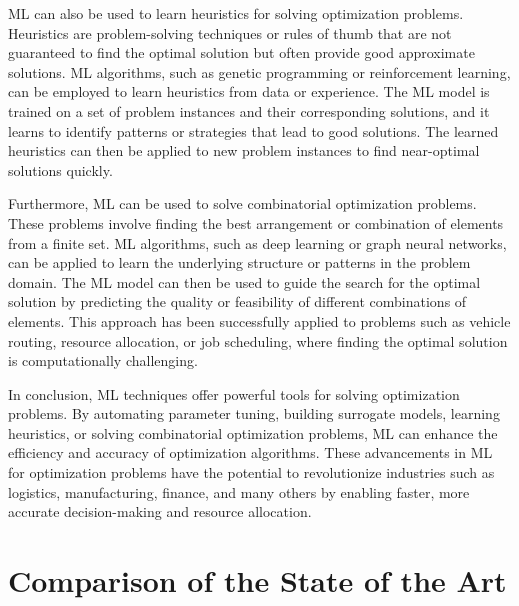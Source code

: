ML can also be used to learn heuristics for solving optimization problems. Heuristics are problem-solving techniques or rules of thumb that are not guaranteed to find the optimal solution but often provide good approximate solutions. ML algorithms, such as genetic programming or reinforcement learning, can be employed to learn heuristics from data or experience. The ML model is trained on a set of problem instances and their corresponding solutions, and it learns to identify patterns or strategies that lead to good solutions. The learned heuristics can then be applied to new problem instances to find near-optimal solutions quickly.

Furthermore, ML can be used to solve combinatorial optimization problems. These problems involve finding the best arrangement or combination of elements from a finite set. ML algorithms, such as deep learning or graph neural networks, can be applied to learn the underlying structure or patterns in the problem domain. The ML model can then be used to guide the search for the optimal solution by predicting the quality or feasibility of different combinations of elements. This approach has been successfully applied to problems such as vehicle routing, resource allocation, or job scheduling, where finding the optimal solution is computationally challenging.

In conclusion, ML techniques offer powerful tools for solving optimization problems. By automating parameter tuning, building surrogate models, learning heuristics, or solving combinatorial optimization problems, ML can enhance the efficiency and accuracy of optimization algorithms. These advancements in ML for optimization problems have the potential to revolutionize industries such as logistics, manufacturing, finance, and many others by enabling faster, more accurate decision-making and resource allocation.
\section{Comparison of the State of the Art}%
